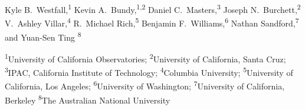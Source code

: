 Kyle B.\ Westfall,\textsuperscript{1}
Kevin A.\ Bundy,\textsuperscript{1,2}
Daniel C.\ Masters,\textsuperscript{3}
Joseph N.\ Burchett,\textsuperscript{2}
V.\ Ashley Villar,\textsuperscript{4}
R.\ Michael Rich,\textsuperscript{5}
Benjamin F.\ Williams,\textsuperscript{6}
Nathan Sandford,\textsuperscript{7}
and
Yuan-Sen Ting \textsuperscript{8}

\begin{small}
\textsuperscript{1}University of California Observatories;
\textsuperscript{2}University of California, Santa Cruz;
\textsuperscript{3}IPAC, California Institute of Technology;
\textsuperscript{4}Columbia University;
\textsuperscript{5}University of California, Los Angeles;
\textsuperscript{6}University of Washington;
\textsuperscript{7}University of California, Berkeley
\textsuperscript{8}The Australian National University
\end{small}

